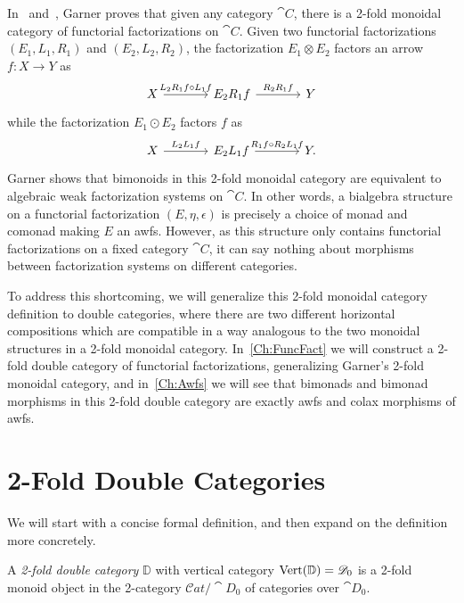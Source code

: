 In~\cite{garner:nwfs} and~\cite{garner:soa}, Garner proves that given any category $\cat{C}$, there is a 2-fold monoidal category of functorial factorizations on $\cat{C}$. Given two functorial factorizations $(E_1,L_1,R_1)$ and $(E_2,L_2,R_2)$, the factorization $E_1\otimes E_2$ factors an arrow $f\colon X\to Y$ as
\begin{equation}\label{Eq:FFOtimes}
\begin{tikzcd}[column sep=large]
	X \rar{L_2R_1f\circ L_1f} & E_2R_1f \rar{R_2R_1f} & Y
\end{tikzcd}
\end{equation}
while the factorization $E_1\odot E_2$ factors $f$ as
\begin{equation}\label{Eq:FFOdot}
\begin{tikzcd}[column sep=large]
	X \rar{L_2L_1f} & E_2L_1 f \rar{R_1f\circ R_2L_1f} & Y.
\end{tikzcd}
\end{equation}
Garner shows that bimonoids in this 2-fold monoidal category are equivalent to algebraic weak factorization systems on $\cat{C}$. In other words, a bialgebra structure on a functorial factorization $(E,\eta,\epsilon)$ is precisely a choice of monad and comonad making $E$ an awfs. However, as this structure only contains functorial factorizations on a fixed category $\cat{C}$, it can say nothing about morphisms between factorization systems on different categories.

To address this shortcoming, we will generalize this 2-fold monoidal category definition to double categories, where there are two different horizontal compositions which are compatible in a way analogous to the two monoidal structures in a 2-fold monoidal category. In~\cref{Ch:FuncFact} we will construct a 2-fold double category of functorial factorizations, generalizing Garner's 2-fold monoidal category, and in~\cref{Ch:Awfs} we will see that bimonads and bimonad morphisms in this 2-fold double category are exactly awfs and colax morphisms of awfs.

\section{2-Fold Double Categories}

We will start with a concise formal definition, and then expand on the definition more concretely.

\begin{definition}
	A \emph{2-fold double category} $\mathbb{D}$ with vertical category $\operatorname{Vert}(\mathbb{D})=\mathscr{D}_0$ is a 2-fold monoid object in the 2-category $\mathcal{C}at/\cat{D}_0$ of categories over $\cat{D}_0$.
\end{definition}

